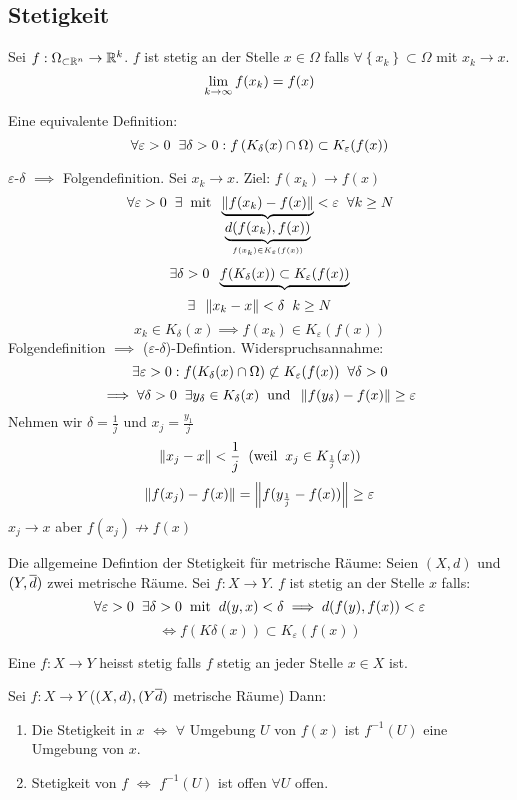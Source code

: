 \subsection{Stetigkeit}
\begin{Def}
  Sei $f:\Omega_{\subset\mathbb{R}^n}\to\mathbb{R}^k$. $f$ ist stetig an der Stelle $x\in\Omega$ falls $\forall \left\{ x_k \right\}\subset\Omega$ mit $x_k\to x$.
  \[\displaystyle\lim_{k\rightarrow\infty} f(x_k)=f(x)\]
\end{Def}
\begin{Lem}
  \label{l:1102282}
  Eine equivalente Definition:
  \[\forall \varepsilon>0\hspace{2mm}\exists \delta>0: f\left( K_\delta(x)\cap \Omega \right)\subset K_\varepsilon(f(x))\]
\end{Lem}
\begin{Bew}
  $\varepsilon$-$\delta$ $\implies$ Folgendefinition. Sei $x_k\to x$. Ziel: $f(x_k)\to f(x)$
  \[\forall \varepsilon>0\hspace{2mm}\exists \hspace{2mm}\text{mit}\hspace{2mm} \underbrace{\left\| f(x_k)-f(x) \right\|}_{\underbrace{d(f(x_k),f(x))}_{f(x_k)\in K_\varepsilon(f(x))}}<\varepsilon\hspace{2mm}\forall k\geq N\]
  \[\exists \delta>0\hspace{2mm} \underbrace{f(K_\delta(x))\subset K_\varepsilon(f(x))}\]
  \[\exists\hspace{2mm} \left\| x_k-x \right\|<\delta\hspace{2mm} k\geq N\]
  \[x_k \in K_\delta(x)\implies f(x_k)\in K_\varepsilon(f(x))\]
  Folgendefinition $\implies$ ($\varepsilon$-$\delta$)-Defintion. Widerspruchsannahme: 
  \[\exists \varepsilon>0: f(K_\delta(x)\cap \Omega)\not\subset K_\varepsilon(f(x))\hspace{2mm}\forall \delta>0\]
  \[\implies\forall \delta>0\hspace{2mm}\exists y_\delta\in K_\delta(x)\hspace{2mm}\text{und}\hspace{2mm} \left\| f(y_\delta)-f(x) \right\|\geq \varepsilon\]
  Nehmen wir $\delta=\frac{1}{j}$ und $x_j=\frac{y_1}{j}$
  \[\left\| x_j-x \right\|<\frac{1}{j}\hspace{2mm}(\text{weil}\hspace{2mm} x_j\in K_{\frac{1}{j}}(x))\]
  \[\left\| f(x_j)-f(x) \right\|=\left\| f(y_{\frac{1}{j}}-f(x)) \right\|\geq\varepsilon\]
  $x_j\to x$ aber $f(x_j)\not\to f(x)$
\end{Bew}
\begin{Def}
  Die allgemeine Defintion der Stetigkeit für metrische Räume: Seien $(X,d)$ und $(Y,\overline{d})$ zwei metrische Räume. Sei $f:X\to Y$. $f$ ist stetig an der Stelle $x$ falls:
  \[\forall \varepsilon>0\hspace{2mm}\exists \delta>0\hspace{2mm}\text{mit}\hspace{2mm} d(y,x)<\delta\implies d(f(y),f(x))<\varepsilon\]
  \[\iff f(K\delta(x))\subset K_\varepsilon(f(x))\]
\end{Def}
\begin{Def}
  Eine $f:X\to Y$ heisst stetig falls $f$ stetig an jeder Stelle $x\in X$ ist.
\end{Def}
\begin{Sat}
  Sei $f:X\to Y$ ($(X,d), (Y\overline{d})$ metrische Räume) Dann:
  \begin{enumerate}
    \item Die Stetigkeit in $x$ $\iff$ $\forall$ Umgebung $U$ von $f(x)$ ist $f^{-1}(U)$ eine Umgebung von $x$.
    \item Stetigkeit von $f$ $\iff$ $f^{-1}(U)$ ist offen $\forall U$ offen.
  \end{enumerate}
\end{Sat}
